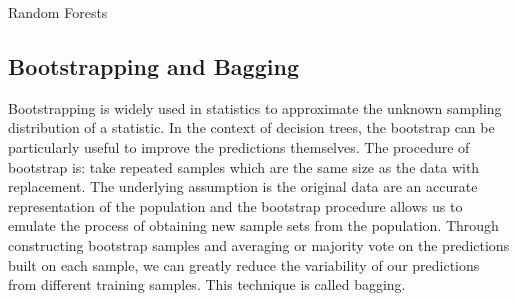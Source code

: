 \documentclass[12pt]{pom_thesis}
\begin{document}
\begin{chapter}{Random Forests}
\subsection{Bootstrapping and Bagging}
Bootstrapping is widely used in statistics to approximate the unknown sampling distribution of a statistic. In the context of decision trees, the bootstrap can be particularly useful to improve the predictions themselves. The procedure of bootstrap is: take repeated samples which are the same size as the data with replacement. The underlying assumption is the original data are an accurate representation of the population and the bootstrap procedure allows us to emulate the process of obtaining new sample sets from the population. Through constructing bootstrap samples and averaging or majority vote on the predictions built on each sample, we can greatly reduce the variability of our predictions from different training samples. This technique is called bagging.


\end{chapter}
\end{document}
